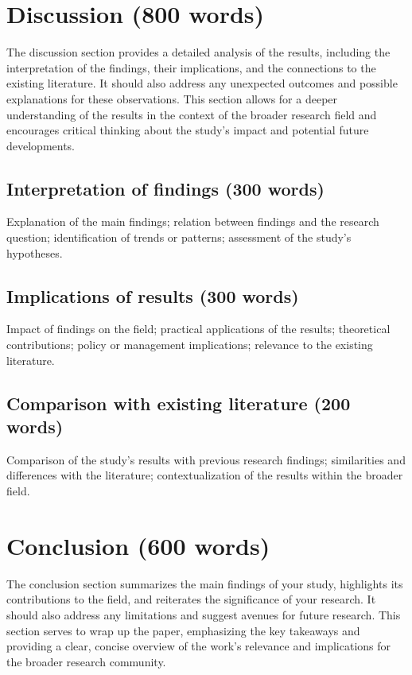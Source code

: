 \documentclass[journal,article,submit,pdftex,moreauthors]{Definitions/mdpi}
\begin{document}
\section{Discussion (800 words)}\label{discussion}
The discussion section provides a detailed analysis of the results, including the interpretation of the findings, their implications, and the connections to the existing literature. It should also address any unexpected outcomes and possible explanations for these observations. This section allows for a deeper understanding of the results in the context of the broader research field and encourages critical thinking about the study's impact and potential future developments.
\subsection{Interpretation of findings (300 words)} Explanation of the main findings; relation between findings and the research question; identification of trends or patterns; assessment of the study's hypotheses.

\subsection{Implications of results (300 words)}Impact of findings on the field; practical applications of the results; theoretical contributions; policy or management implications; relevance to the existing literature.

\subsection{Comparison with existing literature (200 words)}  Comparison of the study's results with previous research findings; similarities and differences with the literature; contextualization of the results within the broader field.


\section{Conclusion (600 words)}\label{conclusion} 
The conclusion section summarizes the main findings of your study, highlights its contributions to the field, and reiterates the significance of your research. It should also address any limitations and suggest avenues for future research. This section serves to wrap up the paper, emphasizing the key takeaways and providing a clear, concise overview of the work's relevance and implications for the broader research community.
\end{document}
